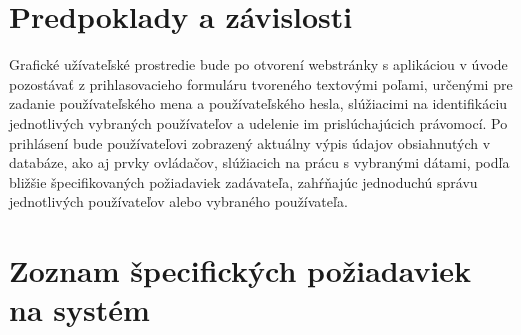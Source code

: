 \documentclass[12pt,a4paper]{article}
\begin{document}
\section{Predpoklady a závislosti}
Grafické užívateľské prostredie bude po otvorení webstránky s aplikáciou v úvode pozostávať z prihlasovacieho formuláru tvoreného textovými poľami, určenými pre zadanie používateľského mena a používateľského hesla, slúžiacimi na identifikáciu jednotlivých vybraných používateľov a udelenie im prislúchajúcich právomocí. Po prihlásení bude používateľovi zobrazený aktuálny výpis údajov obsiahnutých v databáze, ako aj prvky ovládačov, slúžiacich 
na prácu s vybranými dátami, podľa bližšie špecifikovaných požiadaviek zadávateľa, zahŕňajúc jednoduchú správu jednotlivých používateľov alebo vybraného používateľa.

\section{Zoznam špecifických požiadaviek na systém}
\end{document}
